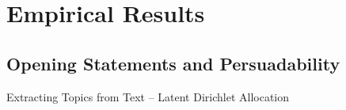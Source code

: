 \documentclass{beamer}
\begin{document}
\section{Empirical Results}

\subsection{Opening Statements and Persuadability}
\begin{frame}{Extracting Topics from Text -- Latent Dirichlet Allocation}
\begin{figure}
\end{figure}
\end{frame}
\end{document}
